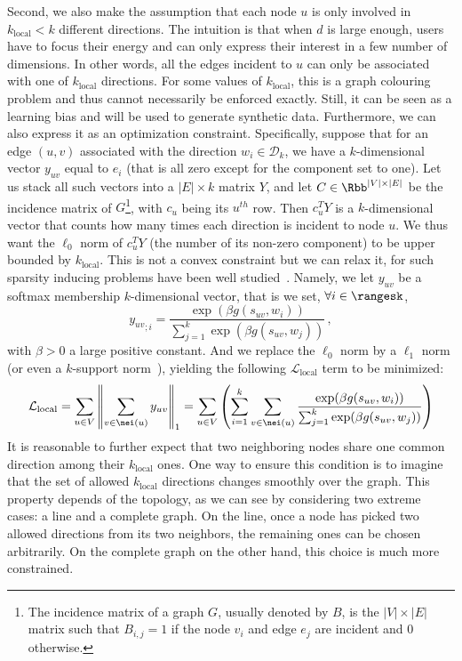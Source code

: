 Second, we also make the assumption that each node $u$ is only involved in $k_\mathrm{local} < k$
different directions. The intuition is that when $d$ is large enough, users have to focus their
energy and can only express their interest in a few number of dimensions. In other words, all the
edges incident to $u$ can only be associated with one of $k_\mathrm{local}$ directions. For
some values of
$k_\mathrm{local}$, this is a \NPc{} graph colouring problem and thus cannot necessarily be enforced
exactly. Still, it can be seen as a learning bias and will be used to generate synthetic data.
Furthermore, we can also express it as an optimization constraint. Specifically, suppose that for
an edge $(u,v)$ associated with the direction $w_i \in \mathcal{D}_k$, we have a $k$-dimensional
vector $y_{uv}$ equal to $e_i$ (that is all zero except for the \ith{} component set to one). Let
us stack all such vectors into a $|E| \times k$ matrix $Y$, and let $C \in \Rbb^{|V| \times |E|}$ be
the incidence matrix of $G$\footnote{The incidence matrix of a graph $G$, usually denoted by $B$, is
the $|V| \times |E|$ matrix such that $B_{i,j} = 1$ if the node $v_i$ and edge $e_j$ are incident
and 0 otherwise.}, with $c_u$ being its $u^{th}$ row. Then $c_u^TY$ is a $k$-dimensional vector that counts
how many times each direction is incident to node $u$. We thus want the $\ell_0$ norm of $c_u^TY$
(\ie the number of its non-zero component) to be upper bounded by $k_\mathrm{local}$.
This is not a convex constraint but we can relax it, for such sparsity inducing problems have been
well studied~\autocite{sparseOptim12}. Namely, we let $y_{uv}$ be a softmax membership
$k$-dimensional vector, that is we set, $\forall i \in \rangesk$,
\begin{equation*}
  {y_{uv}}_{;i} = \frac{\exp(\beta g(s_{uv}, w_i))}{\sum_{j=1}^k \exp(\beta g(s_{uv}, w_j))}\,,
\end{equation*}
with $\beta>0$ a large
positive constant.  And we replace the $\ell_0$ norm by a $\ell_1$ norm (or even a $k$-support
norm~\autocite{KsupportNorm12}), yielding the following $\mathcal{L}_{\mathrm{local}}$ term to be
minimized:
\begin{equation}
  \label{eq:edge_local_loss}
  \mathcal{L}_{\mathrm{local}} =
  \sum_{u \in V} \left\| \sum_{v \in \nei(u)} y_{uv} \right\|_1 =
  \sum_{u \in V} \left( \sum_{i = 1}^k \sum_{v \in \nei(u)}
  \frac{\exp(\beta g(s_{uv}, w_i))}{\sum_{j=1}^k \exp(\beta g(s_{uv}, w_j))} \right)
\end{equation}
It is reasonable to further expect that two neighboring nodes share one common direction among their
$k_\mathrm{local}$ ones. One way to ensure this condition is to imagine that the set of allowed
$k_\mathrm{local}$ directions changes smoothly over the graph. This property depends of the
topology, as we can see by considering two extreme cases: a line and a complete graph. On the line,
once a node has picked two allowed directions from its two neighbors, the remaining ones can be
chosen arbitrarily. On the complete graph on the other hand, this choice is much more constrained.

